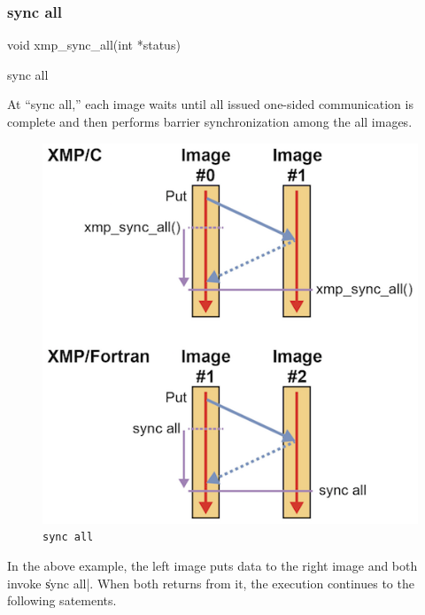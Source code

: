 \subsubsection{sync all}


\begin{XCexample}
void xmp_sync_all(int *status)
\end{XCexample}

\begin{XFexample}
sync all
\end{XFexample}

At ``sync all,'' each image waits until all issued one-sided
communication is complete and then performs barrier synchronization
among the all images.

\begin{figure}
  \centering
  \includegraphics[width=\textwidth]{figs/sync_all.png}
  \caption{{\tt sync all}}
\end{figure}

In the above example, the left image puts data to the right image and
both {\nodes} invoke \|sync all|. When both {\nodes} returns from it, the
execution continues to the following satements.

